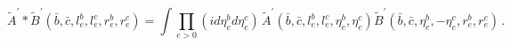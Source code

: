 \begin{equation}
{\tilde{A}}^{\prime }\ast {\tilde{B}}^{\prime }(\bar{b},\bar{c}%
,l_{e}^{b},l_{e}^{c},r_{e}^{b},r_{e}^{c})=\int \prod_{e>0}\left( id\eta
_{e}^{b}d\eta _{e}^{c}\right) \,{\tilde{A}}^{\prime }(\bar{b},\bar{c}%
,l_{e}^{b},l_{e}^{c},\eta _{e}^{b},\eta _{e}^{c}){\tilde{B}}^{\prime }(\bar{b%
},\bar{c},\eta _{e}^{b},-\eta _{e}^{c},r_{e}^{b},r_{e}^{c})\,.
\label{bc_half_star_even}
\end{equation}

